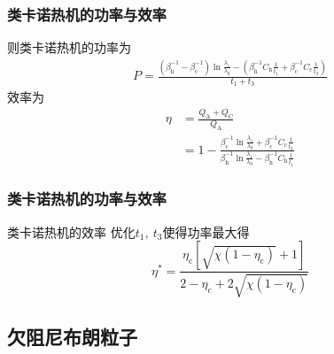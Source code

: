 \documentclass{beamer}
\begin{document}
\begin{frame}
\frametitle{类卡诺热机的功率与效率}
则类卡诺热机的功率为
\begin{equation}
    \begin{split}
        P=\frac{\left(\beta_{\mathrm{h}}^{-1}-\beta_{\mathrm{c}}^{-1}\right) \ln{\frac{\lambda_1}{\lambda_0}} - \left(\beta_{\mathrm{h}}^{-1} C_{\mathrm{h}} \frac{1}{t_1} + \beta_{\mathrm{c}}^{-1} C_{\mathrm{c}} \frac{1}{t_3}\right)}{t_1+t_3}
    \end{split}
    \label{eq3.35}
\end{equation}
效率为
\begin{equation}
    \begin{split}
        \eta &= \frac{Q_{\mathrm{A}} + Q_{\mathrm{C}}}{Q_{\mathrm{A}}}\\ 
        &=1- \frac{\beta_{\mathrm{c}}^{-1} \ln{\frac{\lambda_1}{\lambda_0}} + \beta_{\mathrm{c}}^{-1} C_{\mathrm{c}} \frac{1}{t_3}}{\beta_{\mathrm{h}}^{-1} \ln{\frac{\lambda_1}{\lambda_0}} - \beta_{\mathrm{h}}^{-1} C_{\mathrm{h}} \frac{1}{t_1}}
    \end{split}
    \label{3.20}
\end{equation}
\end{frame}

\begin{frame}
    \frametitle{类卡诺热机的功率与效率}
\begin{alertblock}{类卡诺热机的效率}
    优化$t_1,\ t_3$使得功率最大得
 \begin{equation}
    \eta^* =\frac{\eta_{\mathrm{c}}\left[\sqrt{\chi(1-\eta_{\mathrm{c}})}+1\right]}{2-\eta_{\mathrm{c}}+2 \sqrt{\chi\left(1-\eta_{\mathrm{c}}\right)}}
    \label{eq3.37}
\end{equation}
\end{alertblock}
\end{frame}

\subsection{欠阻尼布朗粒子}


\footnotesize


\end{document}
